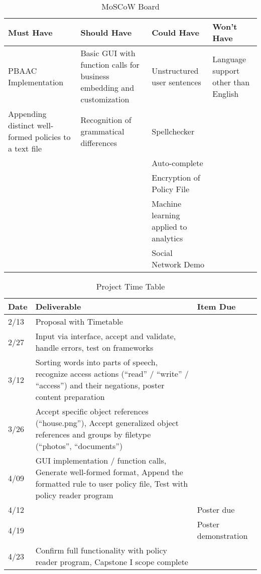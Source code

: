 \documentclass[12pt]{article}
\begin{document}
\begin{table}[p]
    \begin{center}
        \begin{tabular}{ | m{1.3in} | m{1.3in}| m{1.3in} | m{1.3in} | } 
        \hline
        Must Have & Should Have & Could Have & Won't Have \\ 
        \hline
        \hline
        PBAAC Implementation & Basic GUI with function calls for business embedding and customization & Unstructured user sentences & Language support other than English \\ 
        \hline
        Appending distinct well-formed policies to a text file & Recognition of grammatical differences & Spellchecker &   \\ 
        \hline
          &   & Auto-complete &   \\ 
        \hline
          &   & Encryption of Policy File &   \\ 
        \hline
          &   & Machine learning applied to analytics &   \\ 
        \hline
          &   & Social Network Demo &   \\ 
        \hline
        \end{tabular}
        \caption{MoSCoW Board}
        \label{table:1}
    \end{center}
\end{table}

\begin{table}[p]
    \begin{center}
        \begin{tabular}{ | m{0.4in} | m{4in}| m{1.6in} | }
        \hline
        Date & Deliverable & Item Due \\ 
        \hline
        2/13 & Proposal with Timetable &   \\ 
        \hline
        2/27 & Input via interface, accept and validate, handle errors, test on frameworks &   \\ 
        \hline
        3/12 & Sorting words into parts of speech, recognize access actions (“read” / “write” / “access”) and their negations, poster content preparation &   \\ 
        \hline
        3/26 & Accept specific object references (“house.png”), Accept generalized object references and groups by filetype (“photos”, “documents”) &   \\ 
        \hline
        4/09 & GUI implementation / function calls, Generate well-formed format, Append the formatted rule to user policy file, Test with policy reader program &   \\ 
        \hline
        4/12 &   & Poster due \\ 
        \hline
        4/19 &   & Poster demonstration \\ 
        \hline
        4/23 & Confirm full functionality with policy reader program, Capstone I scope complete &   \\ 
        \hline
        \end{tabular}
        \caption{Project Time Table}
        \label{table:2}
    \end{center}
\end{table}



\end{document}

